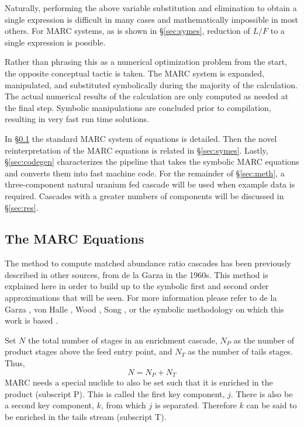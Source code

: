 \documentclass{ansconf}
\begin{document}
Naturally, performing the above variable substitution and elimination to obtain a 
single expression is difficult in many cases and mathematically impossible in most 
others.  For MARC systems, as is shown in \S \ref{sec:symes}, reduction of $L/F$
to a single expression is possible.

Rather than phrasing this as a numerical optimization problem from the start, the 
opposite conceptual tactic is taken.  The MARC system is expanded, manipulated, 
and substituted symbolically during the majority of the calculation.  The actual 
numerical results of the calculation are only computed as needed at the final step.
Symbolic manipulations are concluded prior to compilation, resulting in 
very fast run time solutions.

In \S \ref{sec:marceq} the standard MARC system of equations is detailed. 
Then the novel reinterpretation of the MARC equations is related in 
\S \ref{sec:symes}.  
Lastly, \S \ref{sec:codegen} characterizes the pipeline that takes the symbolic MARC 
equations and converts them into fast machine code.  
For the remainder of \S \ref{sec:meth}, a three-component natural uranium fed 
cascade will be used when example data is required.
Cascades with a greater numbers of components will be discussed in \S \ref{sec:res}.

\subsection{The MARC Equations}
\label{sec:marceq}

The method to compute matched abundance ratio cascades has been 
previously described in other sources, from de la Garza in the
1960s. This method is explained here in order to build up to the symbolic first and 
second order approximations that will be seen.
For more information please refer to de la Garza
\cite{DelaGarza1969}, von Halle \cite{VonHalle1987}, Wood \cite{Wood1999}, 
Song \cite{doi:10.1080/01496391003793884}, or the symbolic methodology on which this 
work is based \cite{Scopatz2012}.

Set $N$ the total number of stages in an enrichment cascade, $N_P$ as the number of 
product stages above the feed entry point, and $N_T$ as the number of tails
stages.  Thus,
\begin{equation}
N = N_P + N_T
\end{equation}
MARC needs a special nuclide to also be set such that it is enriched in the 
product (subscript P).  This is called the first key component, $j$.  
There is also be a second key component, $k$, from which $j$ is 
separated. Therefore $k$ can be said to be enriched in the tails stream (subscript T).
\end{document}
